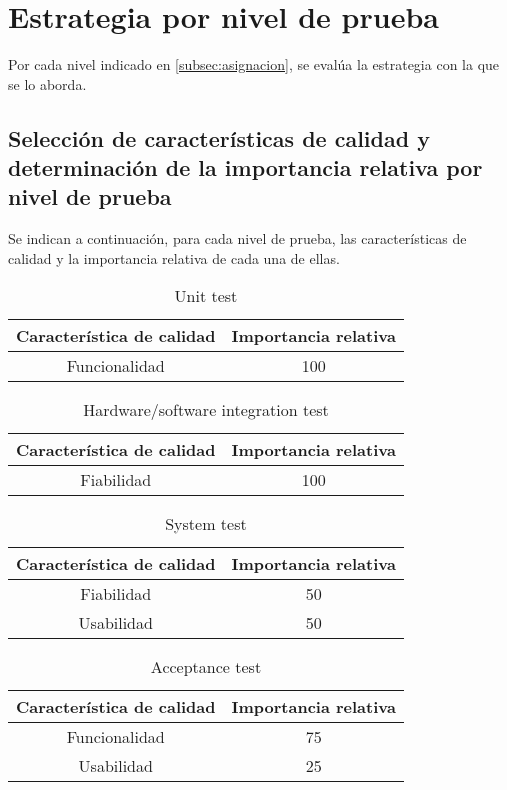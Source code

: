 \documentclass[
11pt,
spanish,
singlespacing,
parskip, 
headsepline,
a4paper
]{article}
\begin{document}
\section{Estrategia por nivel de prueba}
Por cada nivel indicado en \ref{subsec:asignacion}, se evalúa la estrategia con la que se lo aborda.

\subsection{Selección de características de calidad y determinación de la importancia relativa por nivel de prueba}

Se indican a continuación, para cada nivel de prueba, las características de calidad y la importancia relativa de cada una de ellas.

\begin{table}[H]
\centering
\caption{Unit test}
\begin{tabular}{c|c}
Característica de calidad & Importancia relativa \\ \hline
Funcionalidad & 100 \\
\end{tabular}
\end{table}

\begin{table}[H]
\centering
\caption{Hardware/software integration test}
\begin{tabular}{c|c}
Característica de calidad & Importancia relativa \\ \hline
Fiabilidad & 100 \\
\end{tabular}
\end{table}

\begin{table}[H]
\centering
\caption{System test}
\begin{tabular}{c|c}
Característica de calidad & Importancia relativa \\ \hline
Fiabilidad & 50 \\
Usabilidad & 50 \\
\end{tabular}
\end{table}

\begin{table}[H]
\centering
\caption{Acceptance test}
\begin{tabular}{c|c}
Característica de calidad & Importancia relativa \\ \hline
Funcionalidad & 75 \\
Usabilidad & 25 \\
\end{tabular}
\end{table}
\end{document}
